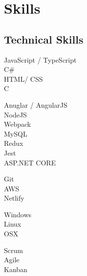 \documentclass[]{deedy-resume-openfont}
\begin{document}
%
%



%
%

\begin{minipage}[t]{0.33\textwidth} 


\section{Skills}
\subsection{Technical Skills}
\textbullet{} JavaScript / TypeScript \\ \textbullet{} C\# \\
\textbullet{} HTML/ CSS \\
\textbullet{} C\\
\sectionsep

\textbullet{} Anuglar / AngularJS\\
\textbullet{} NodeJS\\
\textbullet{} Webpack\\
\textbullet{} MySQL\\
\textbullet{} Redux\\
\textbullet{} Jest\\
\textbullet{} ASP.NET CORE\\
\sectionsep

\textbullet{} Git\\
\textbullet{} AWS\\
\textbullet{} Netlify\\
\sectionsep

\textbullet{} Windows\\
\textbullet{} Linux\\
\textbullet{} OSX\\
\sectionsep

\textbullet{} Scrum\\
\textbullet{} Agile\\
\textbullet{} Kanban\\
\sectionsep


\end{minipage}
\end{document}

